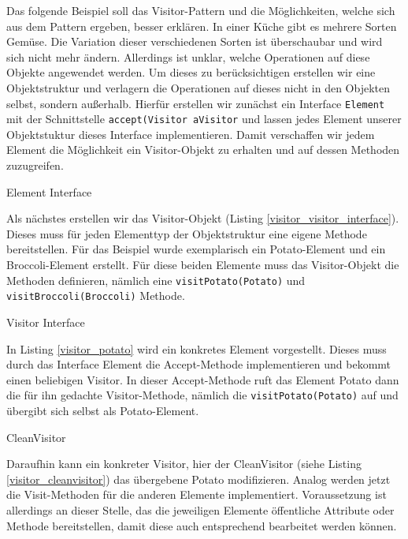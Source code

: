 
Das folgende Beispiel soll das Visitor-Pattern und die Möglichkeiten, welche sich aus dem Pattern ergeben, besser erklären. In einer Küche gibt es mehrere Sorten Gemüse. Die Variation dieser verschiedenen Sorten ist überschaubar und wird sich nicht mehr ändern. Allerdings ist unklar, welche Operationen auf diese Objekte angewendet werden. Um dieses zu berücksichtigen erstellen wir eine Objektstruktur und verlagern die Operationen auf dieses nicht in den Objekten selbst, sondern außerhalb. Hierfür erstellen wir zunächst ein Interface \texttt{Element} mit der Schnittstelle \texttt{accept(Visitor aVisitor} und lassen jedes Element unserer Objektstuktur dieses Interface implementieren. Damit verschaffen wir jedem Element die Möglichkeit ein Visitor-Objekt zu erhalten und auf dessen Methoden zuzugreifen.


\begin{listing}[h!]
   \centering
   \caption{Element Interface}
    \label{visitor_element_interface}
\end{listing}  

Als nächstes erstellen wir das Visitor-Objekt (Listing \ref{visitor_visitor_interface}). Dieses muss für jeden Elementtyp der Objektstruktur eine eigene Methode bereitstellen. Für das Beispiel wurde exemplarisch ein Potato-Element und ein Broccoli-Element erstellt. Für diese beiden Elemente muss das Visitor-Objekt die Methoden definieren, nämlich eine \texttt{visitPotato(Potato)} und \texttt{visitBroccoli(Broccoli)} Methode.


\begin{listing}[h!]
   \centering
   \caption{Visitor Interface}
    \label{visitor_visitor_interface}
\end{listing}  

In Listing \ref{visitor_potato} wird ein konkretes Element vorgestellt. Dieses muss durch das Interface Element die Accept-Methode implementieren und bekommt einen beliebigen Visitor.
In dieser Accept-Methode ruft das Element Potato dann die für ihn gedachte Visitor-Methode, nämlich die \texttt{visitPotato(Potato)} auf und übergibt sich selbst als Potato-Element.

\begin{listing}[h!]
   \centering
   \caption{CleanVisitor}
    \label{visitor_potato}
\end{listing}  

Daraufhin kann ein konkreter Visitor, hier der CleanVisitor (siehe Listing \ref{visitor_cleanvisitor}) das übergebene Potato modifizieren. Analog werden jetzt die Visit-Methoden für die anderen Elemente implementiert. Voraussetzung ist allerdings an dieser Stelle, das die jeweiligen Elemente öffentliche Attribute oder Methode bereitstellen, damit diese auch entsprechend bearbeitet werden können.

